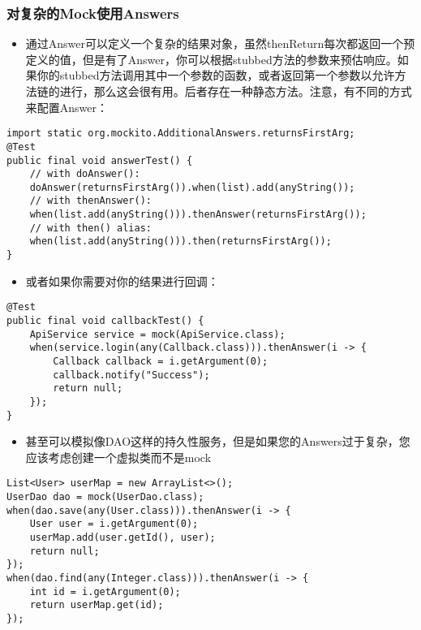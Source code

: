 \documentclass[9pt, b5paper]{article}
\begin{document}
\subsubsection{对复杂的Mock使用Answers}
\label{sec-1-1-14}
\begin{itemize}
\item 通过Answer可以定义一个复杂的结果对象，虽然thenReturn每次都返回一个预定义的值，但是有了Answer，你可以根据stubbed方法的参数来预估响应。如果你的stubbed方法调用其中一个参数的函数，或者返回第一个参数以允许方法链的进行，那么这会很有用。后者存在一种静态方法。注意，有不同的方式来配置Answer：
\end{itemize}
\begin{verbatim}
import static org.mockito.AdditionalAnswers.returnsFirstArg;
@Test
public final void answerTest() {
    // with doAnswer():
    doAnswer(returnsFirstArg()).when(list).add(anyString());
    // with thenAnswer():
    when(list.add(anyString())).thenAnswer(returnsFirstArg());
    // with then() alias:
    when(list.add(anyString())).then(returnsFirstArg());
}
\end{verbatim}
\begin{itemize}
\item 或者如果你需要对你的结果进行回调：
\end{itemize}
\begin{verbatim}
@Test
public final void callbackTest() {
    ApiService service = mock(ApiService.class);
    when(service.login(any(Callback.class))).thenAnswer(i -> {
        Callback callback = i.getArgument(0);
        callback.notify("Success");
        return null;
    });
}
\end{verbatim}
\begin{itemize}
\item 甚至可以模拟像DAO这样的持久性服务，但是如果您的Answers过于复杂，您应该考虑创建一个虚拟类而不是mock
\end{itemize}
\begin{verbatim}
List<User> userMap = new ArrayList<>();
UserDao dao = mock(UserDao.class);
when(dao.save(any(User.class))).thenAnswer(i -> {
    User user = i.getArgument(0);
    userMap.add(user.getId(), user);
    return null;
});
when(dao.find(any(Integer.class))).thenAnswer(i -> {
    int id = i.getArgument(0);
    return userMap.get(id);
});
\end{verbatim}
\end{document}
